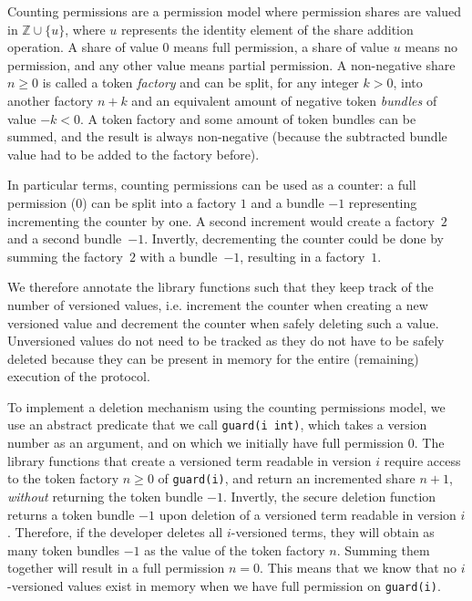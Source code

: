 Counting permissions are a permission model where permission shares are valued in $\mathbb{Z}\cup\{u\}$, where $u$ represents the identity element of the share addition operation. A share of value $0$ means full permission, a share of value $u$ means no permission, and any other value means partial permission. A non-negative share $n\geq0$ is called a token \emph{factory} and can be split, for any integer $k>0$, into another factory $n+k$ and an equivalent amount of negative token \emph{bundles} of value $-k<0$. A token factory and some amount of token bundles can be summed, and the result is always non-negative (because the subtracted bundle value had to be added to the factory before). 

In particular terms, counting permissions can be used as a counter: a full permission (0) can be split into a factory $1$ and a bundle $-1$ representing incrementing the counter by one.
A second increment would create a factory~$2$ and a second bundle~$-1$. Invertly, decrementing the counter could be done by summing the factory~$2$ with a bundle~$-1$, resulting in a factory~$1$.

We therefore annotate the library functions such that they keep track of the number of versioned values, i.e. increment the counter when creating a new versioned value and decrement the counter when safely deleting such a value.
Unversioned values do not need to be tracked as they do not have to be safely deleted because they can be present in memory for the entire (remaining) execution of the protocol.

To implement a deletion mechanism using the counting permissions model, we use an abstract predicate that we call \texttt{guard(i int)}, which takes a version number as an argument, and on which we initially have full permission $0$. The library functions that create a versioned term readable in version $i$ require access to the token factory $n\geq0$ of \texttt{guard(i)}, and return an incremented share $n+1$, \emph{without} returning the token bundle $-1$. Invertly, the secure deletion function returns a token bundle $-1$ upon deletion of a versioned term readable in version $i$. Therefore, if the developer deletes all $i$-versioned terms, they will obtain as many token bundles $-1$ as the value of the token factory $n$. Summing them together will result in a full permission $n = 0$. This means that we know that no $i$-versioned values exist in memory when we have full permission on \texttt{guard(i)}.

